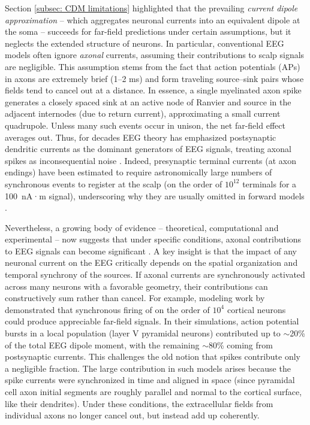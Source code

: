 \documentclass[final, a4paper,masters,en,listoffigures,listoftables,norwegiandates]{NMBU}
\begin{document}
Section \ref{subsec: CDM limitations} highlighted that the prevailing \emph{current dipole approximation} – which aggregates neuronal currents into an equivalent dipole at the soma – succeeds for far-field predictions under certain assumptions, but it neglects the extended structure of neurons. In particular, conventional EEG models often ignore \emph{axonal} currents, assuming their contributions to scalp signals are negligible. This assumption stems from the fact that action potentials (APs) in axons are extremely brief (1–2 ms) and form traveling source–sink pairs whose fields tend to cancel out at a distance. In essence, a single myelinated axon spike generates a closely spaced sink at an active node of Ranvier and source in the adjacent internodes (due to return current), approximating a small current quadrupole. Unless many such events occur in unison, the net far-field effect averages out. Thus, for decades EEG theory has emphasized postsynaptic dendritic currents as the dominant generators of EEG signals, treating axonal spikes as inconsequential noise \cite{McColgan2017}. Indeed, presynaptic terminal currents (at axon endings) have been estimated to require astronomically large numbers of synchronous events to register at the scalp (on the order of $10^{12}$ terminals for a 100~nA·m signal), underscoring why they are usually omitted in forward models \cite{Thio2023}.

Nevertheless, a growing body of evidence – theoretical, computational and experimental – now suggests that under specific conditions, axonal contributions to EEG signals can become significant \cite{Thio2023, McColgan2017, Brake2025}. A key insight is that the impact of any neuronal current on the EEG critically depends on the spatial organization and temporal synchrony of the sources. If axonal currents are synchronously activated across many neurons with a favorable geometry, their contributions can constructively sum rather than cancel. For example, modeling work by \textcite{Murakami2006} demonstrated that synchronous firing of on the order of $10^4$ cortical neurons could produce appreciable far-field signals. In their simulations, action potential bursts in a local population (layer V pyramidal neurons) contributed up to $\sim$20\% of the total EEG dipole moment, with the remaining $\sim$80\% coming from postsynaptic currents. This challenges the old notion that spikes contribute only a negligible fraction. The large contribution in such models arises because the spike currents were synchronized in time and aligned in space (since pyramidal cell axon initial segments are roughly parallel and normal to the cortical surface, like their dendrites). Under these conditions, the extracellular fields from individual axons no longer cancel out, but instead add up coherently.
\end{document}
